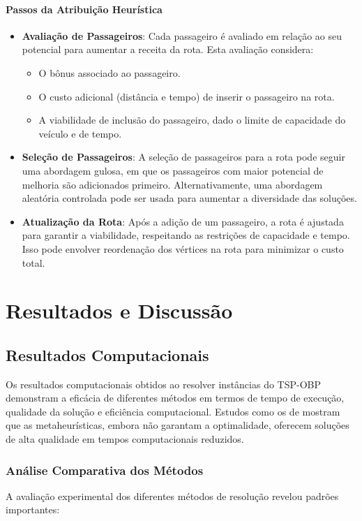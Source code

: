 \documentclass[12pt, a4paper]{report}
\begin{document}
\subsubsection*{Passos da Atribuição Heurística}

\begin{itemize}
    \item \textbf{Avaliação de Passageiros}: Cada passageiro é avaliado em relação ao seu potencial para aumentar a receita da rota. Esta avaliação considera:
    \begin{itemize}
        \item O bônus associado ao passageiro.
        \item O custo adicional (distância e tempo) de inserir o passageiro na rota.
        \item A viabilidade de inclusão do passageiro, dado o limite de capacidade do veículo e de tempo.
    \end{itemize}
    \item \textbf{Seleção de Passageiros}: A seleção de passageiros para a rota pode seguir uma abordagem gulosa, em que os passageiros com maior potencial de melhoria são adicionados primeiro. Alternativamente, uma abordagem aleatória controlada pode ser usada para aumentar a diversidade das soluções.
    \item \textbf{Atualização da Rota}: Após a adição de um passageiro, a rota é ajustada para garantir a viabilidade, respeitando as restrições de capacidade e tempo. Isso pode envolver reordenação dos vértices na rota para minimizar o custo total.
\end{itemize}

\chapter{Resultados e Discussão}

\section{Resultados Computacionais}
Os resultados computacionais obtidos ao resolver instâncias do TSP-OBP demonstram a eficácia de diferentes métodos em termos de tempo de execução, qualidade da solução e eficiência computacional. Estudos como os de \cite{carvalho2022} mostram que as metaheurísticas, embora não garantam a optimalidade, oferecem soluções de alta qualidade em tempos computacionais reduzidos.

\subsection{Análise Comparativa dos Métodos}
A avaliação experimental dos diferentes métodos de resolução revelou padrões importantes:
\end{document}
